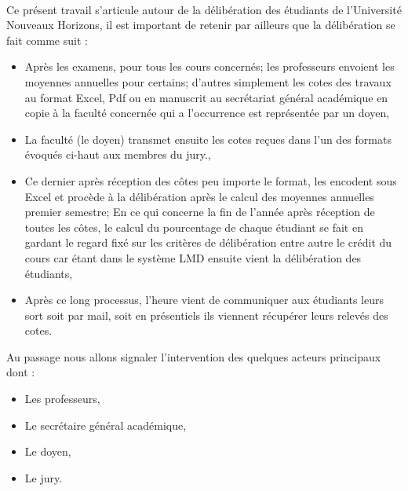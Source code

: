 \begingroup
\paragraph{}
 Ce présent travail s'articule autour de la délibération des étudiants de l'Université Nouveaux Horizons, il est important de retenir par ailleurs que la délibération se fait comme suit :
 \begin{itemize}
 	\item[\labelitemii] Après les examens, pour tous les cours concernés; les professeurs envoient les moyennes annuelles pour certains; d’autres simplement les cotes des travaux au format Excel, Pdf ou en manuscrit au secrétariat général académique en copie à la faculté concernée qui a l'occurrence est représentée par un doyen,
 	\item[\labelitemii] La faculté (le doyen) transmet ensuite les cotes reçues dans l’un des formats évoqués ci-haut aux membres du jury.,
 	\item[\labelitemii] Ce dernier après réception des côtes peu importe le format, les encodent sous Excel et procède à la délibération après le calcul des moyennes annuelles premier semestre; En ce qui concerne la fin de l'année après réception de toutes les côtes, le calcul du pourcentage de chaque étudiant se fait en gardant le regard fixé sur les critères de délibération entre autre le crédit du cours car étant dans le système LMD ensuite vient la délibération des étudiants,
 	\item[\labelitemii] Après ce long processus, l'heure vient de communiquer aux étudiants leurs sort soit par mail, soit en présentiels ils viennent récupérer leurs relevés des cotes.
 \end{itemize} 

Au passage nous allons signaler l'intervention des quelques acteurs principaux dont :
\begin{itemize}
	\item[\labelitemii] Les professeurs,
	\item[\labelitemii] Le secrétaire général académique,
	\item[\labelitemii] Le doyen,
	\item[\labelitemii] Le jury.
\end{itemize}
\endgroup
